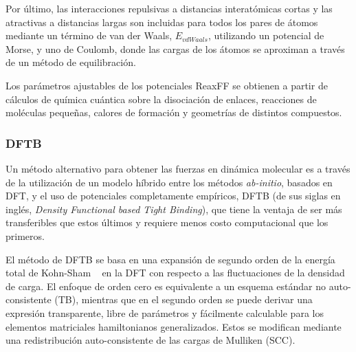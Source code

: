 Por último, las interacciones repulsivas a distancias interatómicas cortas y 
las atractivas a distancias largas son incluidas para todos los pares de átomos
mediante un término de van der Waals, $E_{vdWaals}$, utilizando un potencial de 
Morse, y uno de Coulomb, donde las cargas de los átomos se aproximan a través de 
un método de equilibración.

Los parámetros ajustables de los potenciales ReaxFF se obtienen a partir de 
cálculos de química cuántica sobre la disociación de enlaces, reacciones de 
moléculas pequeñas, calores de formación y geometrías de distintos compuestos.

\subsubsection{DFTB}

Un método alternativo para obtener las fuerzas en dinámica molecular es a través
de la utilización de un modelo híbrido entre los métodos \textit{ab-initio},
basados en DFT, y el uso de potenciales completamente empíricos, DFTB (de sus 
siglas en inglés, \textit{Density Functional based Tight Binding}), que tiene
la ventaja de ser más transferibles que estos últimos y requiere menos costo
computacional que los primeros.

El método de DFTB se basa en una expansión de segundo orden de la energía total 
de Kohn-Sham ~\cite{dft1, dft2} en la DFT con respecto a las fluctuaciones de la 
densidad de carga. El enfoque de orden cero es equivalente a un esquema estándar 
no auto-consistente (TB), mientras que en el segundo orden se puede derivar una 
expresión transparente, libre de parámetros y fácilmente calculable para los 
elementos matriciales hamiltonianos generalizados. Estos se modifican mediante 
una redistribución auto-consistente de las cargas de Mulliken (SCC).


